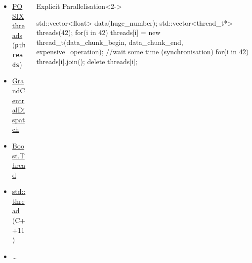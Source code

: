 \documentclass[9pt,xcolor=table]{beamer}
\begin{document}
\begin{frame}[fragile]
  \begin{columns}[c]
    \pause
    \begin{column}{.3\textwidth}
      \begin{itemize}[<3->]\small
      \item \href{http://en.wikipedia.org/wiki/POSIX_Threads}{POSIX threads} (\texttt{pthreads})
      \item \href{https://developer.apple.com/library/mac/documentation/performance/reference/gcd_libdispatch_ref/Reference/reference.html}{GrandCentralDispatch}
      \item \href{http://www.boost.org/doc/libs/1_55_0/doc/html/thread.html}{Boost.Thread}
      \item \href{http://en.cppreference.com/w/cpp/header/thread}{std::thread} (C++11)
      \item \dots{}
      \end{itemize}
    \end{column}
    \begin{column}{.67\textwidth}
      \begin{block}{Explicit Parallelisation}<2->
        \begin{pyglist}[language=c++,numbers=left,style=emacs,fontsize=\small]
std::vector<float> data(huge_number);
std::vector<thread_t*> threads(42);
for(i in 42){
  threads[i] = new thread_t(data_chunk_begin, 
                            data_chunk_end, 
                            expensive_operation);
}
//wait some time (synchronisation)
for(i in 42){
  threads[i].join();
  delete threads[i];
}
        \end{pyglist}
      \end{block}
    \end{column}
  \end{columns}
\end{frame}
\end{document}
